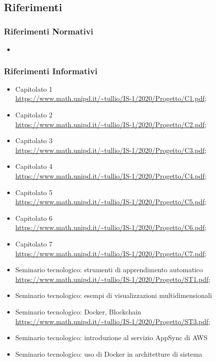 \subsection{Riferimenti}
\subsubsection{Riferimenti Normativi}
\begin{itemize}
	\item {} %
\end{itemize}

\subsubsection{Riferimenti Informativi}
\begin{itemize}
	\item{Capitolato 1\\
		\url{https://www.math.unipd.it/~tullio/IS-1/2020/Progetto/C1.pdf}};
	\item{Capitolato 2\\
		\url{https://www.math.unipd.it/~tullio/IS-1/2020/Progetto/C2.pdf}};
	\item{Capitolato 3\\
		\url{https://www.math.unipd.it/~tullio/IS-1/2020/Progetto/C3.pdf}};
	\item{Capitolato 4\\
		\url{https://www.math.unipd.it/~tullio/IS-1/2020/Progetto/C4.pdf}};
	\item{Capitolato 5\\
		\url{https://www.math.unipd.it/~tullio/IS-1/2020/Progetto/C5.pdf}};
	\item{Capitolato 6\\
		\url{https://www.math.unipd.it/~tullio/IS-1/2020/Progetto/C6.pdf}};
	\item{Capitolato 7\\
		\url{https://www.math.unipd.it/~tullio/IS-1/2020/Progetto/C7.pdf}};
	
	\item {Seminario tecnologico: strumenti di apprendimento automatico\\
		\url{https://www.math.unipd.it/~tullio/IS-1/2020/Progetto/ST1.pdf}};
	\item {Seminario tecnologico: esempi di visualizzazioni multidimensionali}
	
	\item {Seminario tecnologico: Docker, Blockchain\\
		\url{https://www.math.unipd.it/~tullio/IS-1/2020/Progetto/ST3.pdf}};
	\item {Seminario tecnologico: introduzione al servizio AppSync di AWS}
	
	\item {Seminario tecnologico: uso di Docker in architetture di sistema}
\end{itemize}

